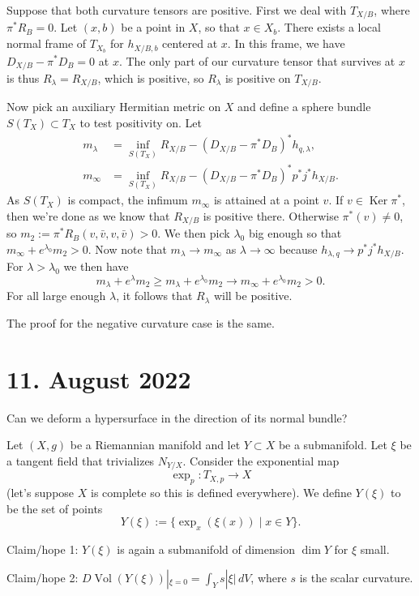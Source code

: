\documentclass[11pt]{amsart}
\theoremstyle{definition}
\DeclareMathOperator{\Vol}{Vol}
\DeclareMathOperator{\Ker}{Ker}
\begin{document}
Suppose that both curvature tensors are positive.
First we deal with $T_{X/B}$, where $\pi^*R_B = 0$.
Let $(x,b)$ be a point in $X$, so that $x \in X_b$.
There exists a local normal frame of $T_{X_b}$ for $h_{X/B,b}$ centered at $x$.
In this frame, we have $D_{X/B} - \pi^* D_B = 0$ at $x$.
The only part of our curvature tensor that survives at $x$ is thus $R_\lambda =
R_{X/B}$,
which is positive, so $R_\lambda$ is positive on $T_{X/B}$.

Now pick an auxiliary Hermitian metric on $X$ and define a sphere bundle
$S(T_X) \subset T_X$ to test positivity on.
Let
\begin{align*}
m_\lambda &=
\inf_{S(T_X)} R_{X/B}
- (D_{X/B} - \pi^* D_{B})^* h_{q,\lambda},
\\
m_\infty &=
\inf_{S(T_X)} R_{X/B}
- (D_{X/B} - \pi^* D_{B})^* p^* j^* h_{X/B}.
\end{align*}
As $S(T_X)$ is compact, the infimum $m_\infty$ is attained at a point $v$.
If $v \in \Ker \pi^*$, then we're done as we know that $R_{X/B}$ is positive
there.
Otherwise $\pi^*(v) \not= 0$, so $m_2 := \pi^*R_B(v, \bar v, v, \bar v) > 0$.
We then pick $\lambda_0$ big enough so that $m_\infty + e^{\lambda_0} m_2 > 0$.
Now note that
$m_\lambda \to m_\infty$ as $\lambda \to \infty$ because $h_{\lambda,q} \to
p^*j^*h_{X/B}$.
For $\lambda > \lambda_0$ we then have
$$
m_\lambda + e^\lambda m_2
\geq m_\lambda + e^{\lambda_0} m_2
\to m_\infty  + e^{\lambda_0} m_2
> 0.
$$
For all large enough $\lambda$, it follows that $R_\lambda$ will be positive.

The proof for the negative curvature case is the same.



\section*{11. August 2022}

Can we deform a hypersurface in the direction of its normal bundle?

Let $(X, g)$ be a Riemannian manifold and let $Y \subset X$ be a submanifold.
Let $\xi$ be a tangent field that trivializes $N_{Y/X}$.
Consider the exponential map
$$
\exp_p : T_{X,p} \to X
$$
(let's suppose $X$ is complete so this is defined everywhere).
We define $Y(\xi)$ to be the set of points
$$
Y(\xi) := \{ \exp_x(\xi(x)) \mid x \in Y \}.
$$

Claim/hope 1: $Y(\xi)$ is again a submanifold of dimension $\dim Y$ for $\xi$ small.

Claim/hope 2: $D\Vol(Y(\xi))|_{\xi = 0} = \int_Y s |\xi| \, dV$, where $s$ is the
scalar curvature.
\end{document}
